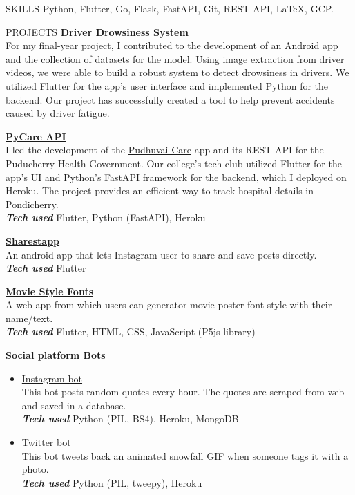 \documentclass{template}
\begin{document}
\begin{rSection}{SKILLS}
Python, Flutter, Go, Flask, FastAPI, Git, REST API, \LaTeX, GCP.

\end{rSection}

\begin{rSection}{PROJECTS}
\textbf{Driver Drowsiness System} \\
For my final-year project, I contributed to the development of an Android app and the collection of datasets for the model. Using image extraction from driver videos, we were able to build a robust system to detect drowsiness in drivers. We utilized Flutter for the app's user interface and implemented Python for the backend. Our project has successfully created a tool to help prevent accidents caused by driver fatigue.

\textbf{\href{https://github.com/princesanjivy/pycare-api}{PyCare API}} \\
I led the development of the \href{https://sites.google.com/view/dscpec/pudhuvai-care}{Pudhuvai Care} app and its REST API for the Puducherry Health Government. Our college's tech club utilized Flutter for the app's UI and Python's FastAPI framework for the backend, which I deployed on Heroku. The project provides an efficient way to track hospital details in Pondicherry. \\
\textbf{\textit{Tech used} } Flutter, Python (FastAPI), Heroku

\textbf{\href{https://play.google.com/store/apps/details?id=com.princeappstudio.sharestapp}{Sharestapp}} \\ 
An android app that lets Instagram user to share and save posts directly. \\
\textbf{\textit{Tech used} } Flutter

\textbf{\href{https://github.com/princesanjivy/moviestylefonts}{Movie Style Fonts}} \\ 
A web app from which users can generator movie poster font style with their name/text. \\
\textbf{\textit{Tech used} } Flutter, HTML, CSS, JavaScript (P5js library)

\textbf{Social platform Bots}
\begin{itemize}
    \item \href{https://github.com/princesanjivy/instagram-quotebot}{Instagram bot} \\
    This bot posts random quotes every hour. The quotes are scraped from web and saved in a database. \\
    \textbf{\textit{Tech used} } Python (PIL, BS4), Heroku, MongoDB
    
    \item \href{https://github.com/princesanjivy/snowfall-twitterbot}{Twitter bot} \\
    This bot tweets back an animated snowfall GIF when someone tags it with a photo. \\
    \textbf{\textit{Tech used} } Python (PIL, tweepy), Heroku
    
\end{itemize}

\end{rSection} 
\end{document}
